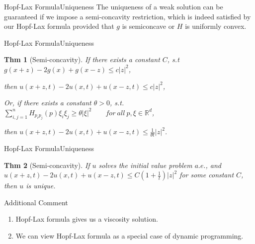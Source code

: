 \documentclass[english]{pkuslide}
\newtheorem{Thm}{Thm}
\begin{document}
	\begin{frame}{Hopf-Lax Formula}{Uniqueness}
	The uniqueness of a weak solution can be guaranteed if we impose a semi-concavity restriction, which is indeed satisfied by our Hopf-Lax formula provided that $g$ is semiconcave or $H$ is uniformly convex.
	\end{frame}
	\begin{frame}{Hopf-Lax Formula}{Uniqueness}
	\begin{Thm}[Semi-concavity]
	If there exists a constant $C$, s.t \begin{math} g(x+z)-2g(x)+g(x-z) \leq c |z|^2\end{math},
	
	then \begin{math} u(x+z,t)-2u(x,t)+u(x-z,t) \leq c |z|^2\end{math},
        
	Or, if there exists a constant $\theta >0$, s.t. \begin{math} \sum_{i,j=1}^{n}H_{p_{i}p_{j}}(p)\xi_{i}\xi_{j} \geq \theta |\xi|^2 \qquad for\  all\  p, \xi \in \mathbb{R}^{d} \end{math},
	
	then \begin{math} u(x+z,t)-2u(x,t)+u(x-z,t) \leq \frac{1}{\theta t} |z|^2\end{math}.
	\end{Thm}
		\end{frame}
	\begin{frame}{Hopf-Lax Formula}{Uniqueness}
	\begin{Thm}[Semi-concavity]
	If $u$ solves the initial value problem $a.e.$, and \begin{math} u(x+z,t)-2u(x,t)+u(x-z,t) \leq C(1+\frac{1}{t}) |z|^2\end{math} for some constant $C$, then $u$ is unique.
	\end{Thm}
	\end{frame}
	\begin{frame}{Additional Comment}
\begin{enumerate}[<+->]
\item Hopf-Lax formula gives us a viscosity solution.
\item We can view Hopf-Lax formula as a special case of dynamic programming.
\end{enumerate}
	\end{frame}
\end{document}
